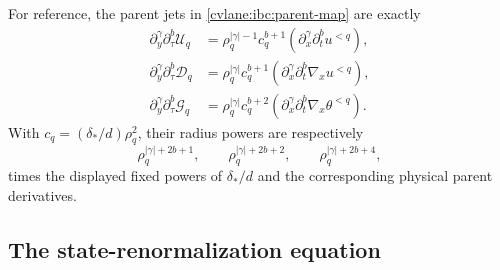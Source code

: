 For reference, the parent jets in \eqref{cvlane:ibc:parent-map} are exactly
\begin{align}
 \partial_y^\gamma\partial_\tau^b\mathcal U_q
 &=\rho_q^{|\gamma|-1}c_q^{b+1}
   (\partial_x^\gamma\partial_t^bu^{<q}),
 \label{cvlane:ibc:parent-u-jets}\\
 \partial_y^\gamma\partial_\tau^b\mathcal D_q
 &=\rho_q^{|\gamma|}c_q^{b+1}
   (\partial_x^\gamma\partial_t^b\nabla_xu^{<q}),
 \label{cvlane:ibc:parent-d-jets}\\
 \partial_y^\gamma\partial_\tau^b\mathcal G_q
 &=\rho_q^{|\gamma|}c_q^{b+2}
   (\partial_x^\gamma\partial_t^b\nabla_x\theta^{<q}).
 \label{cvlane:ibc:parent-g-jets}
\end{align}
With $c_q=(\delta_*/d)\rho_q^2$, their radius powers are respectively
\begin{equation}\label{cvlane:ibc:parent-radius-powers}
 \rho_q^{|\gamma|+2b+1},\qquad
 \rho_q^{|\gamma|+2b+2},\qquad
 \rho_q^{|\gamma|+2b+4},
\end{equation}
times the displayed fixed powers of $\delta_*/d$ and the corresponding
physical parent derivatives.

\subsection{The state-renormalization equation}

